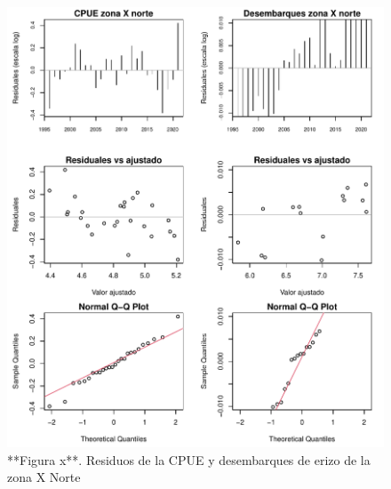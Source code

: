 \documentclass[
]{article}
\begin{document}
\begin{figure}

{\centering \includegraphics{Figuras/Fig_residualesIndicesXN-1} 

}

\caption{**Figura x**. Residuos de la CPUE y desembarques de erizo de la zona X Norte}\label{fig:Fig_residualesIndicesXN}
\end{figure}
\end{document}
